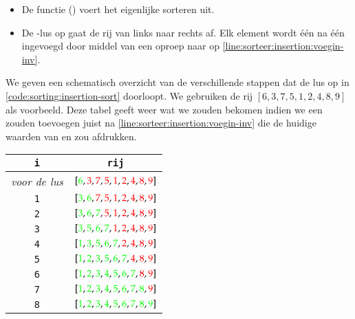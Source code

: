 \begin{itemize}
\begin{itemize}
        \end{itemize}
  \item De functie 
        ()
        voert het eigenlijke sorteren uit.
  \item De -lus op 
        gaat de rij van links naar rechts af. Elk element wordt \'e\'en na \'e\'en ingevoegd
        door middel van een oproep naar  op \cref{line:sorteer:insertion:voegin-inv}.
\end{itemize}

\begin{example}
We geven een schematisch overzicht van de verschillende stappen dat de
lus op 
in \cref{code:sorting:insertion-sort} doorloopt. We gebruiken de rij $[6,3,7,5,1,2,4,8,9]$ als voorbeeld.
Deze tabel geeft weer wat we zouden bekomen indien we een  zouden toevoegen
juist na \cref{line:sorteer:insertion:voegin-inv} die de huidige waarden van 
en  zou afdrukken.
\begin{center}
  \newcommand{\IN}[1]{{\color{red}#1}}
  \newcommand{\OUT}[1]{{\color{green}#1}}
  \begin{tabular}{cc}
    {\tt\bfseries i} & {\tt\bfseries rij} \\
    \hline
    {\it voor de lus} & $[\OUT6,\IN3,\IN7,\IN5,\IN1,\IN2,\IN4,\IN8,\IN9]$ \\ \hline
    {\tt 1} & $[\OUT3,\OUT6,\IN7,\IN5,\IN1,\IN2,\IN4,\IN8,\IN9]$ \\ \hline
    {\tt 2} & $[\OUT3,\OUT6,\OUT7,\IN5,\IN1,\IN2,\IN4,\IN8,\IN9]$ \\ \hline
    {\tt 3} & $[\OUT3,\OUT5,\OUT6,\OUT7,\IN1,\IN2,\IN4,\IN8,\IN9]$ \\ \hline
    {\tt 4} & $[\OUT1,\OUT3,\OUT5,\OUT6,\OUT7,\IN2,\IN4,\IN8,\IN9]$ \\ \hline
    {\tt 5} & $[\OUT1,\OUT2,\OUT3,\OUT5,\OUT6,\OUT7,\IN4,\IN8,\IN9]$ \\ \hline
    {\tt 6} & $[\OUT1,\OUT2,\OUT3,\OUT4,\OUT5,\OUT6,\OUT7,\IN8,\IN9]$ \\ \hline
    {\tt 7} & $[\OUT1,\OUT2,\OUT3,\OUT4,\OUT5,\OUT6,\OUT7,\OUT8,\IN9]$ \\ \hline
    {\tt 8} & $[\OUT1,\OUT2,\OUT3,\OUT4,\OUT5,\OUT6,\OUT7,\OUT8,\OUT9]$
  \end{tabular}
\end{center}
\end{example}

